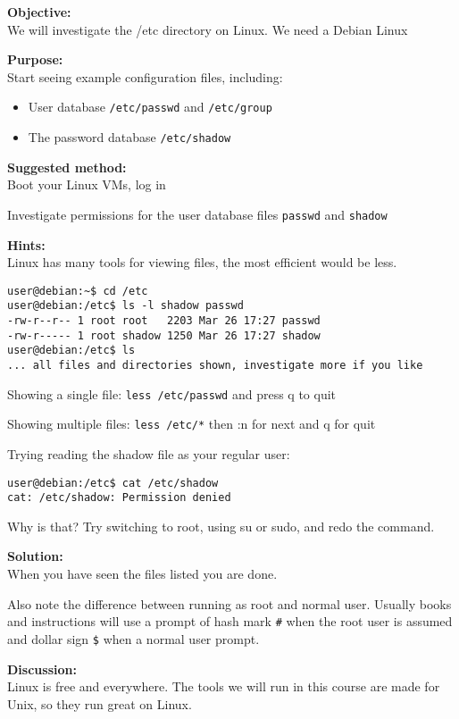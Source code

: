 \documentclass[a4paper,11pt,notitlepage]{report}
\begin{document}
{\bf Objective:}\\
We will investigate the /etc directory on Linux. We need a Debian Linux

{\bf Purpose:}\\
Start seeing example configuration files, including:
\begin{itemize}
  \item User database \verb+/etc/passwd+ and \verb+/etc/group+
  \item The password database \verb+/etc/shadow+
\end{itemize}

{\bf Suggested method:}\\
Boot your Linux VMs, log in

Investigate permissions for the user database files \verb+passwd+ and \verb+shadow+

{\bf Hints:}\\
Linux has many tools for viewing files, the most efficient would be less.

\begin{verbatim}
user@debian:~$ cd /etc
user@debian:/etc$ ls -l shadow passwd
-rw-r--r-- 1 root root   2203 Mar 26 17:27 passwd
-rw-r----- 1 root shadow 1250 Mar 26 17:27 shadow
user@debian:/etc$ ls
... all files and directories shown, investigate more if you like
\end{verbatim}

Showing a single file: \verb+less /etc/passwd+ and press q to quit

Showing multiple files: \verb+less /etc/*+ then :n for next and q for quit

Trying reading the shadow file as your regular user:
\begin{verbatim}
user@debian:/etc$ cat /etc/shadow
cat: /etc/shadow: Permission denied
\end{verbatim}

Why is that? Try switching to root, using su or sudo, and redo the command.

{\bf Solution:}\\
When you have seen the files listed you are done.

Also note the difference between running as root and normal user. Usually books and instructions will use a prompt of hash mark \verb+#+ when the root user is assumed and dollar sign \verb+$+ when a normal user prompt.

{\bf Discussion:}\\
Linux is free and everywhere. The tools we will run in this course are made for Unix, so they run great on Linux.
\end{document}

